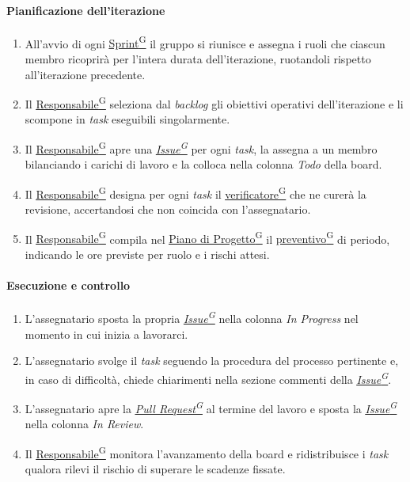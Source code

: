 \documentclass[a4paper,12pt]{article}
\providecommand{\glslink}[2]{\href{https://alittlebyte-19.github.io/Documentazione/glossario.html\#gls-#1}{\underline{#2}\textsuperscript{\scriptsize G}}}
\begin{document}
\paragraph{Pianificazione dell'iterazione}
\begin{enumerate}
    \item All'avvio di ogni \glslink{sprint}{Sprint} il gruppo si riunisce e assegna i ruoli che ciascun membro ricoprirà per l'intera durata dell'iterazione, ruotandoli rispetto all'iterazione precedente.
    \item Il \glslink{responsabile}{Responsabile} seleziona dal \textit{backlog} gli obiettivi operativi dell'iterazione e li scompone in \textit{task} eseguibili singolarmente.
    \item Il \glslink{responsabile}{Responsabile} apre una \textit{\glslink{issue}{Issue}} per ogni \textit{task}, la assegna a un membro bilanciando i carichi di lavoro e la colloca nella colonna \textit{Todo} della board.
    \item Il \glslink{responsabile}{Responsabile} designa per ogni \textit{task} il \glslink{verificatore}{verificatore} che ne curerà la revisione, accertandosi che non coincida con l'assegnatario.
    \item Il \glslink{responsabile}{Responsabile} compila nel \glslink{piano-di-progetto}{Piano di Progetto} il \glslink{preventivo}{preventivo} di periodo, indicando le ore previste per ruolo e i rischi attesi.
\end{enumerate}

\paragraph{Esecuzione e controllo}
\begin{enumerate}
    \item L'assegnatario sposta la propria \textit{\glslink{issue}{Issue}} nella colonna \textit{In Progress} nel momento in cui inizia a lavorarci.
    \item L'assegnatario svolge il \textit{task} seguendo la procedura del processo pertinente e, in caso di difficoltà, chiede chiarimenti nella sezione commenti della \textit{\glslink{issue}{Issue}}.
    \item L'assegnatario apre la \textit{\glslink{pull-request}{Pull Request}} al termine del lavoro e sposta la \textit{\glslink{issue}{Issue}} nella colonna \textit{In Review}.
    \item Il \glslink{responsabile}{Responsabile} monitora l'avanzamento della board e ridistribuisce i \textit{task} qualora rilevi il rischio di superare le scadenze fissate.
\end{enumerate}
\end{document}
